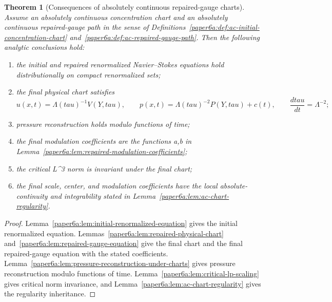 \documentclass[11pt]{amsart}
\def\({}%
\def\){}%
\def\tau{tau}%
\theoremstyle{plain}
\newtheorem{theorem}{Theorem}[section]
\theoremstyle{definition}
\theoremstyle{remark}
\begin{document}
\begin{theorem}[Consequences of absolutely continuous repaired-gauge charts]
\label{paper6a:thm:ac-repaired-gauge-consequences}
Assume an absolutely continuous concentration chart and an absolutely
continuous repaired-gauge path in the sense of
Definitions~\ref{paper6a:def:ac-initial-concentration-chart}
and~\ref{paper6a:def:ac-repaired-gauge-path}.  Then the
following analytic conclusions hold:
\begin{enumerate}[label=\textup{(\roman*)}]
\item the initial and repaired renormalized Navier--Stokes equations hold
distributionally on compact renormalized sets;
\item the final physical chart satisfies
\[
  u(x,t)=\Lambda(\tau)^{-1}V(Y,\tau),
  \qquad
  p(x,t)=\Lambda(\tau)^{-2}P(Y,\tau)+c(t),
  \qquad
  \frac{d\tau}{dt}=\Lambda^{-2};
\]
\item pressure reconstruction holds modulo functions of time;
\item the final modulation coefficients are the functions \(a,b\) in
Lemma~\ref{paper6a:lem:repaired-modulation-coefficients};
\item the critical \(L^3\) norm is invariant under the final chart;
\item the final scale, center, and modulation coefficients have the local
absolute-continuity and integrability stated in
Lemma~\ref{paper6a:lem:ac-chart-regularity}.
\end{enumerate}
\end{theorem}

\begin{proof}
Lemma~\ref{paper6a:lem:initial-renormalized-equation} gives the initial
renormalized equation.
Lemmas~\ref{paper6a:lem:repaired-physical-chart}
and~\ref{paper6a:lem:repaired-gauge-equation}
give the final chart and the final repaired-gauge equation with the stated
coefficients.  Lemma~\ref{paper6a:lem:pressure-reconstruction-under-charts} gives
pressure reconstruction modulo functions of time.
Lemma~\ref{paper6a:lem:critical-lp-scaling} gives critical norm
invariance, and Lemma~\ref{paper6a:lem:ac-chart-regularity} gives the
regularity inheritance.
\end{proof}
\end{document}
